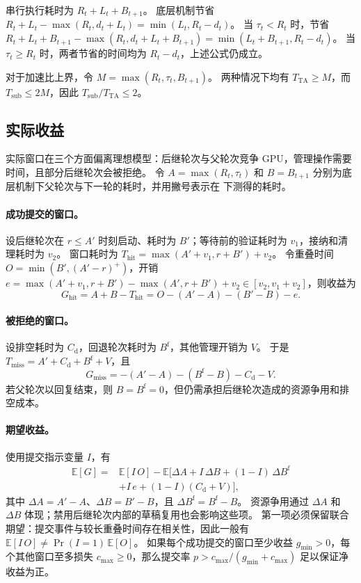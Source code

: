 串行执行耗时为 $R_t+L_t+B_{t+1}$。
底层机制节省 $R_t+L_t-\max(R_t,d_t+L_t)=\min(L_t,R_t-d_t)$。
当 $\tau_t<R_t$ 时，\method 节省 $R_t+L_t+B_{t+1}-\max(R_t,d_t+L_t+B_{t+1})=\min(L_t+B_{t+1},R_t-d_t)$。
当 $\tau_t\ge R_t$ 时，两者节省的时间均为 $R_t-d_t$，上述公式仍成立。

对于加速比上界，令 $M=\max(R_t,\tau_t,B_{t+1})$。
两种情况下均有 $T_{\text{TA}}\ge M$，而 $T_{\text{sub}}\le 2M$，因此 $T_{\text{sub}}/T_{\text{TA}}\le 2$。

\subsection{实际收益}
\label{app:proofs:gain}

实际窗口在三个方面偏离理想模型：后继轮次与父轮次竞争 GPU，管理操作需要时间，且部分后继轮次会被拒绝。
令 $A=\max(R_t,\tau_t)$ 和 $B=B_{t+1}$ 分别为底层机制下父轮次与下一轮的耗时，并用撇号表示在 \method 下测得的耗时。

\paragraph{成功提交的窗口。}
设后继轮次在 $r\le A'$ 时刻启动、耗时为 $B'$；等待前的验证耗时为 $v_1$，接纳和清理耗时为 $v_2$。
窗口耗时为 $T_{\text{hit}}=\max(A'+v_1,r+B')+v_2$。
令重叠时间 $O=\min(B',(A'-r)^+)$，开销 $e=\max(A'+v_1,r+B')-\max(A',r+B')+v_2\in[v_2,v_1+v_2]$，则收益为
\[
G_{\text{hit}}=A+B-T_{\text{hit}}=O-(A'-A)-(B'-B)-e.
\]

\paragraph{被拒绝的窗口。}
设排空耗时为 $C_{\text{d}}$，回退轮次耗时为 $B^{\text{f}}$，其他管理开销为 $V$。
于是 $T_{\text{miss}}=A'+C_{\text{d}}+B^{\text{f}}+V$，且
\[
G_{\text{miss}}=-(A'-A)-(B^{\text{f}}-B)-C_{\text{d}}-V.
\]
若父轮次以回复结束，则 $B=B^{\text{f}}=0$，但仍需承担后继轮次造成的资源争用和排空成本。

\paragraph{期望收益。}
使用提交指示变量 $I$，有
\[
\begin{aligned}
\mathbb{E}[G]={}&\mathbb{E}[I\,O]-\mathbb{E}\big[\Delta A+I\,\Delta B+(1-I)\,\Delta B^{\text{f}}\\
&+I\,e+(1-I)(C_{\text{d}}+V)\big],
\end{aligned}
\]
其中 $\Delta A=A'-A$、$\Delta B=B'-B$，且 $\Delta B^{\text{f}}=B^{\text{f}}-B$。
资源争用通过 $\Delta A$ 和 $\Delta B$ 体现；禁用后继轮次内部的草稿复用也会影响这些项。
第一项必须保留联合期望：提交事件与较长重叠时间存在相关性，因此一般有 $\mathbb{E}[I\,O]\neq\Pr(I=1)\,\mathbb{E}[O]$。
如果每个成功提交的窗口至少收益 $g_{\min}>0$，每个其他窗口至多损失 $c_{\max}\ge 0$，那么提交率 $p>c_{\max}/(g_{\min}+c_{\max})$ 足以保证净收益为正。


